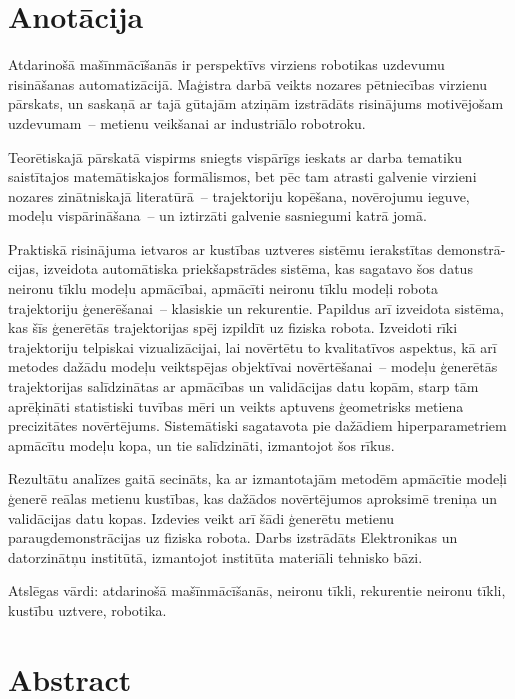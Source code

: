 \documentclass[12pt, a4paper]{article}
\numberwithin{equation}{section} %
\begin{document}

\newpage

\section*{Anotācija}
\thispagestyle{empty}

Atdarinošā mašīnmācīšanās ir perspektīvs virziens robotikas uzdevumu risināšanas automatizācijā. Maģistra darbā veikts nozares pētniecības virzienu pārskats, un saskaņā ar tajā gūtajām atziņām izstrādāts risinājums motivējošam uzdevumam~-- metienu veikšanai ar industriālo robotroku.

Teorētiskajā pārskatā vispirms sniegts vispārīgs ieskats ar darba tematiku saistītajos matemātiskajos formālismos, bet pēc tam atrasti galvenie virzieni nozares zinātniskajā literatūrā~-- trajektoriju kopēšana, novērojumu ieguve, modeļu vispārināšana~-- un iztirzāti galvenie sasniegumi katrā jomā.

Praktiskā risinājuma ietvaros ar kustības uztveres sistēmu ierakstītas demonstrā-cijas, izveidota automātiska priekšapstrādes sistēma, kas sagatavo šos datus neironu tīklu modeļu apmācībai, apmācīti neironu tīklu modeļi robota trajektoriju ģenerēšanai~-- klasiskie un rekurentie. Papildus arī izveidota sistēma, kas šīs ģenerētās trajektorijas spēj izpildīt uz fiziska robota. Izveidoti rīki trajektoriju telpiskai vizualizācijai, lai novērtētu to kvalitatīvos aspektus, kā arī metodes dažādu modeļu veiktspējas objektīvai novērtēšanai~-- modeļu ģenerētās trajektorijas salīdzinātas ar apmācības un validācijas datu kopām, starp tām aprēķināti statistiski tuvības mēri un veikts aptuvens ģeometrisks metiena precizitātes novērtējums. Sistemātiski sagatavota pie dažādiem hiperparametriem apmācītu modeļu kopa, un tie salīdzināti, izmantojot šos rīkus.


Rezultātu analīzes gaitā secināts, ka ar izmantotajām metodēm apmācītie modeļi ģenerē reālas metienu kustības, kas dažādos novērtējumos aproksimē treniņa un validācijas datu kopas. Izdevies veikt arī šādi ģenerētu metienu paraugdemonstrācijas uz fiziska robota. Darbs izstrādāts Elektronikas un datorzinātņu institūtā, izmantojot institūta materiāli tehnisko bāzi. \bigbreak

Atslēgas vārdi: atdarinošā mašīnmācīšanās, neironu tīkli, rekurentie neironu tīkli, kustību uztvere, robotika.

\newpage
{}
\section*{Abstract}
\thispagestyle{empty}
\end{document}
